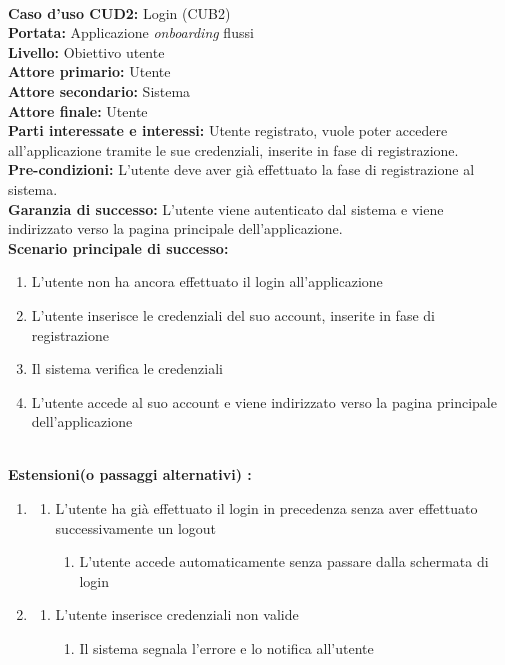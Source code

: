 


\ \\
\textbf{Caso d’uso CUD2:} Login (CUB2) \\
\textbf{Portata:} Applicazione \textit{onboarding} flussi\\
\textbf{Livello:} Obiettivo utente \\
\textbf{Attore primario:} Utente \\
\textbf{Attore secondario:} Sistema \\
\textbf{Attore finale:} Utente \\
\textbf{Parti interessate e interessi:}
Utente registrato, vuole poter accedere all’applicazione tramite le sue credenziali, inserite in fase di
registrazione.\\
\textbf{Pre-condizioni:} L’utente deve aver già effettuato la fase di registrazione al sistema. \\
\textbf{Garanzia di successo:} L'utente viene autenticato dal sistema e viene indirizzato verso la pagina principale dell'applicazione. \\
\textbf{Scenario principale di successo:} 
\begin{enumerate}
  \item L’utente non ha ancora effettuato il login all’applicazione
  \item L’utente inserisce le credenziali del suo account, inserite in fase di registrazione
  \item Il sistema verifica le credenziali
  \item L’utente accede al suo account e viene indirizzato verso la pagina principale dell’applicazione
\end{enumerate} 
\  \\
\textbf{Estensioni(o passaggi alternativi) :}
\begin{enumerate}
 \item
     \begin{enumerate}
     \item L’utente ha già effettuato il login in precedenza senza aver effettuato successivamente un logout
        \begin{enumerate}
            \item L'utente accede automaticamente senza passare dalla schermata di login
        \end{enumerate}
    \end{enumerate}
 \setcounter{enumi}{2}
 \item 
     \begin{enumerate}
     \item L’utente inserisce credenziali non valide
        \begin{enumerate}
            \item Il sistema segnala l’errore e lo notifica all’utente
        \end{enumerate}
    \end{enumerate}
\end{enumerate}




